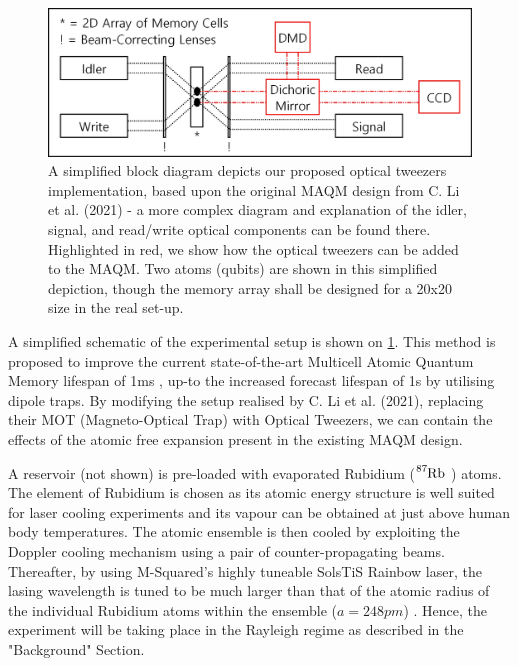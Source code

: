 \documentclass{epsrc}
\begin{document}
\begin{figure}[!tbp]
	\begin{center}
		\includegraphics[width=\textwidth]{img/setup.jpg}
		\vspace{-30pt}
		\caption{A simplified block diagram depicts our proposed optical tweezers implementation, based upon the original MAQM design from C. Li et al. (2021)  - a more complex diagram and explanation of the idler, signal, and read/write optical components can be found there. Highlighted in red, we show how the optical tweezers can be added to the MAQM. Two atoms (qubits) are shown in this simplified depiction, though the memory array shall be designed for a 20x20 size in the real set-up.}
		\label{fig:full}
	\end{center}
\end{figure} 

A simplified schematic of the experimental setup is shown on \ref{fig:full}. This method is proposed to improve the current state-of-the-art Multicell Atomic Quantum Memory lifespan of 1ms , up-to the increased forecast lifespan of 1s by utilising dipole traps. By modifying the setup realised by C. Li et al. (2021), replacing their MOT (Magneto-Optical Trap) with Optical Tweezers, we can contain the effects of the atomic free expansion present in the existing MAQM design.

A reservoir (not shown) is pre-loaded with evaporated Rubidium ($ \ce{^{87}Rb}$ ) atoms. The element of Rubidium is chosen as its atomic energy structure is well suited for laser cooling experiments and its vapour can be obtained at just above human body temperatures. The atomic ensemble is then cooled by exploiting the Doppler cooling mechanism using a pair of counter-propagating beams. Thereafter, by using M-Squared's highly tuneable SolsTiS Rainbow laser, the lasing wavelength is tuned to be much larger than that of the atomic radius of the individual Rubidium atoms within the ensemble ($ a = 248pm $) . Hence, the experiment will be taking place in the Rayleigh regime as described in the "Background" Section. 
\end{document}
